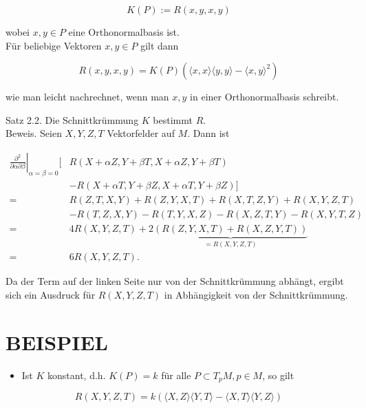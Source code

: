 \documentclass[10pt]{article}
\begin{document}
$$
K(P):=R(x, y, x, y)
$$

wobei $x, y \in P$ eine Orthonormalbasis ist.\\
Für beliebige Vektoren $x, y \in P$ gilt dann

$$
R(x, y, x, y)=K(P)\left(\langle x, x\rangle\langle y, y\rangle-\langle x, y\rangle^{2}\right)
$$

wie man leicht nachrechnet, wenn man $x, y$ in einer Orthonormalbasis schreibt.

Satz 2.2. Die Schnittkrümmung $K$ bestimmt $R$.\\
Beweis. Seien $X, Y, Z, T$ Vektorfelder auf $M$. Dann ist

$$
\begin{aligned}
\left.\frac{\partial^{2}}{\partial \alpha \partial \beta}\right|_{\alpha=\beta=0}[ & R(X+\alpha Z, Y+\beta T, X+\alpha Z, Y+\beta T) \\
& -R(X+\alpha T, Y+\beta Z, X+\alpha T, Y+\beta Z)] \\
= & R(Z, T, X, Y)+R(Z, Y, X, T)+R(X, T, Z, Y)+R(X, Y, Z, T) \\
& -R(T, Z, X, Y)-R(T, Y, X, Z)-R(X, Z, T, Y)-R(X, Y, T, Z) \\
= & 4 R(X, Y, Z, T)+2 \underbrace{(R(Z, Y, X, T)+R(X, Z, Y, T))}_{=R(X, Y, Z, T)} \\
= & 6 R(X, Y, Z, T) .
\end{aligned}
$$

Da der Term auf der linken Seite nur von der Schnittkrümmung abhängt, ergibt sich ein Ausdruck für $R(X, Y, Z, T)$ in Abhängigkeit von der Schnittkrümmung.

\section*{BEISPIEL}
\begin{itemize}
  \item Ist $K$ konstant, d.h. $K(P)=k$ für alle $P \subset T_{p} M, p \in M$, so gilt
\end{itemize}

$$
R(X, Y, Z, T)=k(\langle X, Z\rangle\langle Y, T\rangle-\langle X, T\rangle\langle Y, Z\rangle)
$$
\end{document}
